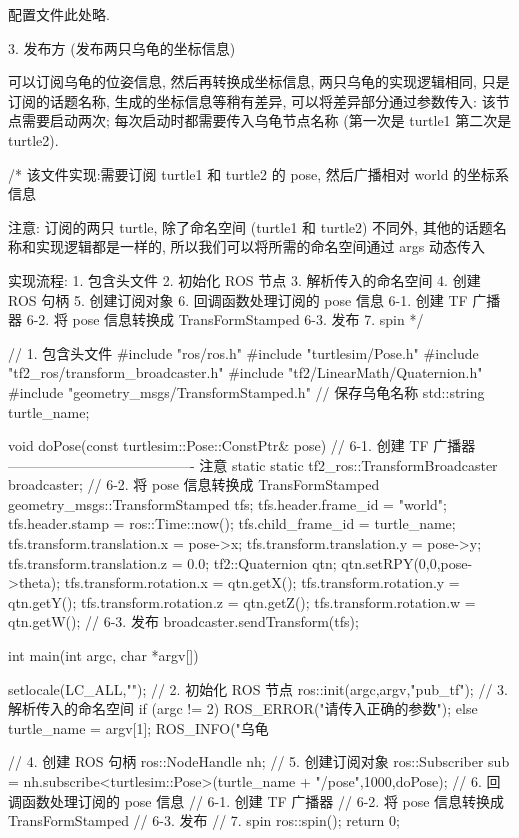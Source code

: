 \documentclass[openany, fontset=windowsold]{ctexbook}
\theoremstyle{kaiti}
\theoremstyle{normal}
\begin{document}
配置文件此处略.

3. 发布方 (发布两只乌龟的坐标信息)

可以订阅乌龟的位姿信息, 然后再转换成坐标信息, 两只乌龟的实现逻辑相同, 只是订阅的话题名称, 生成的坐标信息等稍有差异, 可以将差异部分通过参数传入: 该节点需要启动两次; 每次启动时都需要传入乌龟节点名称 (第一次是 turtle1 第二次是 turtle2).

\begin{cpp}
  /*  
      该文件实现:需要订阅 turtle1 和 turtle2 的 pose, 然后广播相对 world 的坐标系信息

      注意: 订阅的两只 turtle, 除了命名空间 (turtle1 和 turtle2) 不同外,
            其他的话题名称和实现逻辑都是一样的, 
            所以我们可以将所需的命名空间通过 args 动态传入

      实现流程:
          1. 包含头文件
          2. 初始化 ROS 节点
          3. 解析传入的命名空间
          4. 创建 ROS 句柄
          5. 创建订阅对象
          6. 回调函数处理订阅的 pose 信息
              6-1. 创建 TF 广播器
              6-2. 将 pose 信息转换成 TransFormStamped
              6-3. 发布
          7. spin
  */

  // 1. 包含头文件
  #include "ros/ros.h"
  #include "turtlesim/Pose.h"
  #include "tf2_ros/transform_broadcaster.h"
  #include "tf2/LinearMath/Quaternion.h"
  #include "geometry_msgs/TransformStamped.h"
  // 保存乌龟名称
  std::string turtle_name;

  void doPose(const turtlesim::Pose::ConstPtr& pose){
      //  6-1. 创建 TF 广播器 ---------------------------------------- 注意 static
      static tf2_ros::TransformBroadcaster broadcaster;
      //  6-2. 将 pose 信息转换成 TransFormStamped
      geometry_msgs::TransformStamped tfs;
      tfs.header.frame_id = "world";
      tfs.header.stamp = ros::Time::now();
      tfs.child_frame_id = turtle_name;
      tfs.transform.translation.x = pose->x;
      tfs.transform.translation.y = pose->y;
      tfs.transform.translation.z = 0.0;
      tf2::Quaternion qtn;
      qtn.setRPY(0,0,pose->theta);
      tfs.transform.rotation.x = qtn.getX();
      tfs.transform.rotation.y = qtn.getY();
      tfs.transform.rotation.z = qtn.getZ();
      tfs.transform.rotation.w = qtn.getW();
      //  6-3. 发布
      broadcaster.sendTransform(tfs);
  } 

  int main(int argc, char *argv[])
  {
      setlocale(LC_ALL,"");
      // 2. 初始化 ROS 节点
      ros::init(argc,argv,"pub_tf");
      // 3. 解析传入的命名空间
      if (argc != 2)
      {
          ROS_ERROR("请传入正确的参数");
      } else {
          turtle_name = argv[1];
          ROS_INFO("乌龟 %
      }

      // 4. 创建 ROS 句柄
      ros::NodeHandle nh;
      // 5. 创建订阅对象
      ros::Subscriber sub = nh.subscribe<turtlesim::Pose>(turtle_name + "/pose",1000,doPose);
      //     6. 回调函数处理订阅的 pose 信息
      //         6-1. 创建 TF 广播器
      //         6-2. 将 pose 信息转换成 TransFormStamped
      //         6-3. 发布
      // 7. spin
      ros::spin();
      return 0;
  }
\end{cpp}
\end{document}
